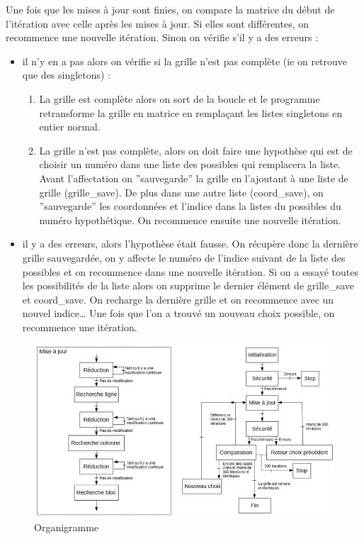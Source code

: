 \documentclass[12pt]{article}
\begin{document}
\noindent
Une fois que les mises à jour sont finies, on compare la matrice du début de l'itération avec celle après les mises à jour. Si elles sont différentes, on recommence une nouvelle itération. Sinon on vérifie s'il y a des erreurs :
\begin{itemize}[label=\textbullet]
\item  il n'y en a pas alors on vérifie si la grille n'est pas complète (ie on retrouve que des singletons) :
\begin{enumerate}
\item La grille est complète alors on sort de la boucle et le programme retransforme la grille en matrice en remplaçant les listes singletons en entier normal. 
\item La grille n'est pas complète, alors on doit faire une hypothèse qui est de choisir un numéro dans une liste des possibles qui remplacera la liste. Avant l'affectation on ''sauvegarde'' la grille en l'ajoutant à une liste de grille (grille\_save). De plus dans une autre liste (coord\_save), on ''sauvegarde'' les coordonnées et l'indice dans la listes du possibles du numéro hypothétique. On recommence ensuite une nouvelle itération.
\end{enumerate}
\item il y a des erreurs, alors l'hypothèse était fausse. On récupère donc la dernière grille sauvegardée, on y affecte le numéro de l'indice suivant de la liste des possibles et on recommence dans une nouvelle itération. Si on a essayé toutes les possibilités de la liste alors on supprime le dernier élément de  grille\_save et  coord\_save. On recharge la dernière grille et on recommence avec un nouvel indice… Une fois que l'on a trouvé un nouveau choix possible, on recommence une itération.
\end{itemize}
\begin{figure}[!h]
	\centering
   	\includegraphics[scale = 0.85]{k1.png}
   	\caption{\label{ho} Organigramme }
\end{figure}
\end{document}
